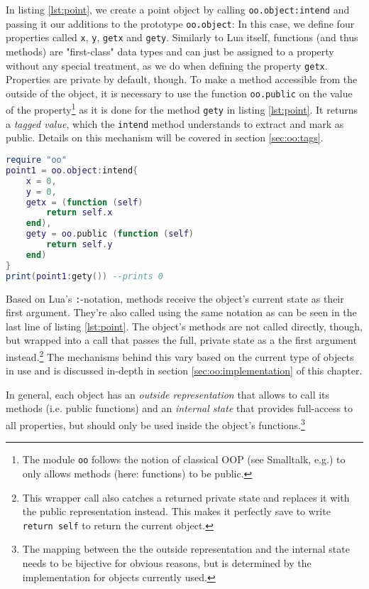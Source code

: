 In listing \ref{lst:point}, we create a point object by calling \texttt{oo.object:intend} and passing it our additions to the prototype \texttt{oo.object}: In this case, we define four properties called \texttt{x}, \texttt{y}, \texttt{getx} and \texttt{gety}. Similarly to Lua itself, functions (and thus methods) are "first-class" data types and can just be assigned to a property without any special treatment, as we do when defining the property \texttt{getx}. Properties are private by default, though. To make a method accessible from the outside of the object, it is necessary to use the function \texttt{oo.public} on the value of the property\footnote{The module \texttt{oo} follows the notion of classical OOP (see Smalltalk, e.g.) to only allows methods (here: functions) to be public.} as it is done for the method \texttt{gety} in listing \ref{lst:point}. It returns a \emph{tagged value}, which the \texttt{intend} method understands to extract and mark as public. Details on this mechanism will be covered in section \ref{sec:oo:tags}.

\begin{lstlisting}[language=lua, caption={Creating an object with the \texttt{oo} module.}, label=lst:point, name=lst:point]
require "oo"
point1 = oo.object:intend{
	x = 0,
	y = 0,
	getx = (function (self)
		return self.x
	end),
	gety = oo.public (function (self)
		return self.y
	end)
}
print(point1:gety()) --prints 0
\end{lstlisting}

Based on Lua's \texttt{:}-notation, methods receive the object's current state as their first argument. They're also called using the same notation as can be seen in the last line of listing \ref{lst:point}. The object's methods are not called directly, though, but wrapped into a call that passes the full, private state as a the first argument instead.\footnote{This wrapper call also catches a returned private state and replaces it with the public representation instead. This makes it perfectly save to write \texttt{return self} to return the current object.} The mechanisms behind this vary based on the current type of objects in use and is discussed in-depth in section \ref{sec:oo:implementation} of this chapter.

In general, each object has an \emph{outside representation} that allows to call its methods (i.e. public functions) and an \emph{internal state} that provides full-access to all properties, but should only be used inside the object's functions.\footnote{The mapping between the the outside representation and the internal state needs to be bijective for obvious reasons, but is determined by the implementation for objects currently used.}


